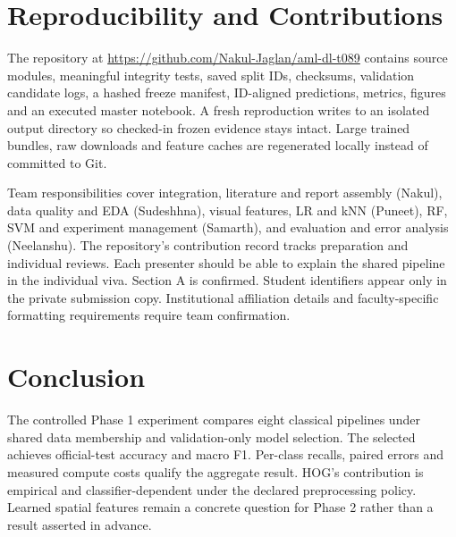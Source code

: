 \documentclass[conference]{IEEEtran}
\begin{document}
\section{Reproducibility and Contributions}
The repository at \url{https://github.com/Nakul-Jaglan/aml-dl-t089} contains
source modules, meaningful integrity tests, saved split IDs, checksums,
validation candidate logs, a hashed freeze manifest, ID-aligned predictions,
metrics, figures and an executed master notebook. A fresh reproduction writes
to an isolated output directory so checked-in frozen evidence stays intact.
Large trained bundles, raw downloads and feature caches are regenerated locally
instead of committed to Git.

Team responsibilities cover integration, literature and report assembly
(Nakul), data quality and EDA (Sudeshhna), visual features, LR and kNN (Puneet),
RF, SVM and experiment management (Samarth), and evaluation and error analysis
(Neelanshu). The repository's contribution record tracks preparation and
individual reviews. Each presenter should be able to explain the shared
pipeline in the individual viva. Section A is confirmed. Student identifiers
appear only in the private submission copy. Institutional affiliation details
and faculty-specific formatting requirements require team confirmation.

\section{Conclusion}
The controlled Phase 1 experiment compares eight classical pipelines under
shared data membership and validation-only model selection. The selected
\SelectedName{} achieves \SelectedAccuracy{} official-test accuracy and
\SelectedFone{} macro F1. Per-class recalls, paired errors and measured compute
costs qualify the aggregate result. HOG's contribution is empirical and
classifier-dependent under the declared preprocessing policy. Learned spatial
features remain a concrete question for Phase 2 rather than a result asserted
in advance.



\end{document}
